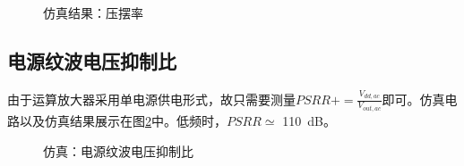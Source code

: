 \documentclass[UTF8]{ctexart}
\numberwithin{figure}{subsection}
\numberwithin{table}{subsection}
\numberwithin{equation}{subsection}
\begin{document}
\begin{figure}[H]
    \centering
    \caption{仿真结果：压摆率}
    \label{SR sim result}
\end{figure}


\subsection{电源纹波电压抑制比}
由于运算放大器采用单电源供电形式，故只需要测量\(PSRR+ = \frac{V_{dd,ac}}{V_{out,ac}}\)即可。仿真电路以及仿真结果展示在图\ref{PSRR simulation}中。低频时，\(PSRR \simeq \) \SI[]{110}{\dB}。

\begin{figure}[H]
    \centering
    \caption{仿真：电源纹波电压抑制比}
    \label{PSRR simulation}
\end{figure}
\end{document}
